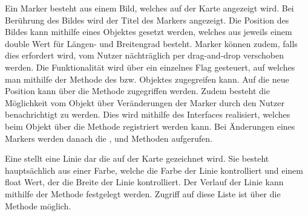 Ein Marker besteht aus einem Bild, welches auf der Karte angezeigt wird. Bei Berührung des Bildes wird der Titel des Markers angezeigt. Die Position des Bildes kann mithilfe eines  Objektes gesetzt werden, welches aus jeweils einem double Wert für Längen- und Breitengrad besteht. Marker können zudem, falls dies erfordert wird, vom Nutzer nächträglich per drag-and-drop verschoben werden. Die Funktionalität wird über ein einzelnes Flag gesteuert, auf welches man mithilfe der  Methode des  bzw.  Objektes zugegreifen kann. Auf die neue Position kann über die  Methode zugegriffen werden. Zudem besteht die Möglichkeit vom  Objekt über Veränderungen der Marker durch den Nutzer benachrichtigt zu werden. Dies wird mithilfe des  Interfaces realisiert, welches beim  Objekt über die  Methode registriert werden kann. Bei Änderungen eines Markers werden danach die ,  und  Methoden aufgerufen.
	
Eine  stellt eine Linie dar die auf der Karte gezeichnet wird. Sie besteht hauptsächlich aus einer Farbe, welche die Farbe der Linie kontrolliert und einem float Wert, der die Breite der Linie kontrolliert. Der Verlauf der Linie kann mithilfe der  Methode festgelegt werden. Zugriff auf diese Liste ist über die  Methode möglich.

